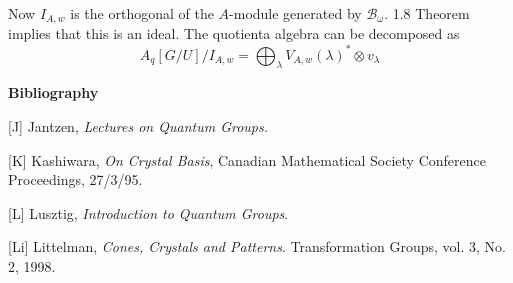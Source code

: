 \documentclass[11pt,fleqn]{article}
\newcommand\ot{\otimes}
\newcommand\B{\mathcal B}
\begin{document}
Now $I_{A,w}$ is the orthogonal of the $A$-module generated by $\B_\omega$. 1.8 Theorem
implies that this is an ideal. The quotienta algebra can be decomposed as
$$ A_q[G/U]/I_{A,w} = \bigoplus_\lambda V_{A,w}(\lambda)^* \ot v_\lambda$$


\textbf{Bibliography}

[J] Jantzen, \emph{Lectures on Quantum Groups.}

[K] Kashiwara, \emph{On Crystal Basis}, Canadian Mathematical Society Conference
Proceedings, 27/3/95.

[L] Lusztig, \emph{Introduction to Quantum Groups}.

[Li] Littelman, \emph{Cones, Crystals and Patterns}. Transformation Groups, vol. 3, No. 2,
1998.
\end{document}
